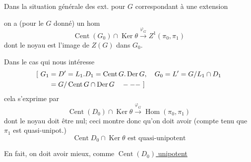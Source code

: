 Dans la situation générale des ext. pour $G$ correspondant
à une extension


on a (pour le $G$ donné) un hom
\[
\operatorname{Cent}(G_0)\cap\operatorname{Ker}\theta\xrightarrow{\varphi_G}Z^1(\pi_0,\pi_1)
\]
dont le noyau est l'image de $Z(G)$ dans $G_0$.


Dans le cas qui nous intéresse
\[
\begin{aligned}
\relax[\ G_1&=D'=L_1.D_1=\operatorname{Cent}G.\operatorname{Der}G,\quad
G_0=L'=G/L_1\cap D_1\\
&=G/\operatorname{Cent}G\cap\operatorname{Der}G\quad ---\ ]
\end{aligned}
\]
cela  s'exprime par
\[
\operatorname{Cent}(D_0)\cap\operatorname{Ker}\theta\xrightarrow{\varphi_G}\operatorname{Hom}(\pi_0,\pi_1)
\]
dont le noyau doit être nul; ceci montre
donc qu'on doit avoir (compte tenu
que $\pi_1$ est quasi-unipot.)
\[
\boxed{\operatorname{Cent}D_0\cap\operatorname{Ker}\theta\text{ est quasi-unipotent}}
\]

En fait, on doit avoir mieux, comme
 \uline{$\operatorname{Cent}(D_0)$ unipotent}

